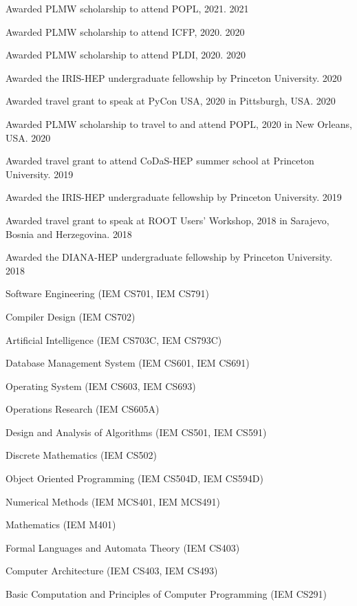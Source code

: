 \documentclass[10pt, letterpaper]{fulldeps}
\begin{document}
%
%
\begin{tightitemize}
    \item Awarded PLMW scholarship to attend POPL, 2021. \hfill{2021}
    \item Awarded PLMW scholarship to attend ICFP, 2020. \hfill{2020}
    \item Awarded PLMW scholarship to attend PLDI, 2020. \hfill{2020}
    \item Awarded the IRIS-HEP undergraduate fellowship by Princeton University. \hfill{2020}
    \item Awarded travel grant to speak at PyCon USA, 2020 in Pittsburgh, USA. \hfill{2020}
    \item Awarded PLMW scholarship to travel to and attend POPL, 2020 in New Orleans, USA. \hfill{2020}
    \item Awarded travel grant to attend CoDaS-HEP summer school at Princeton University. \hfill{2019}
    \item Awarded the IRIS-HEP undergraduate fellowship by Princeton University. \hfill{2019}
    \item Awarded travel grant to speak at ROOT Users' Workshop, 2018 in Sarajevo, Bosnia and Herzegovina. \hfill{2018}
	\item Awarded the DIANA-HEP undergraduate fellowship by Princeton University. \hfill{2018}
\end{tightitemize}

\begin{tightitemize}
\item Software Engineering (IEM CS701, IEM CS791)
\item Compiler Design (IEM CS702)
\item Artificial Intelligence (IEM CS703C, IEM CS793C)
\item Database Management System (IEM CS601, IEM CS691)
\item Operating System (IEM CS603, IEM CS693)
\item Operations Research (IEM CS605A)
\item Design and Analysis of Algorithms (IEM CS501, IEM CS591)
\item Discrete Mathematics (IEM CS502)
\item Object Oriented Programming (IEM CS504D, IEM CS594D)
\item Numerical Methods (IEM MCS401, IEM MCS491)
\item Mathematics (IEM M401)
\item Formal Languages and Automata Theory (IEM CS403)
\item Computer Architecture (IEM CS403, IEM CS493)
\item Basic Computation and Principles of Computer Programming (IEM CS291)
\end{tightitemize}
\end{document}
